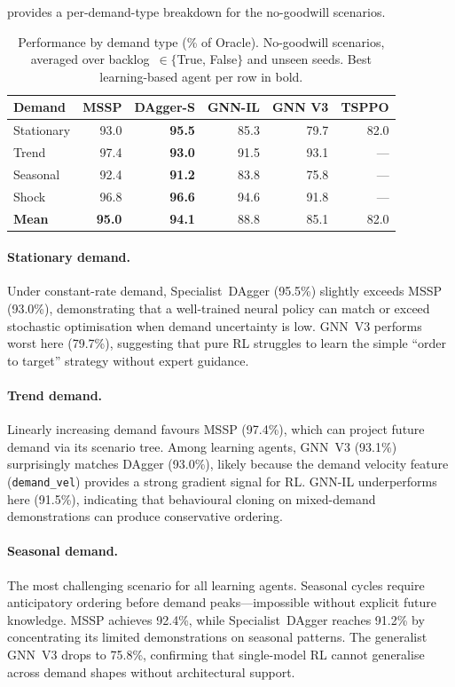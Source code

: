  provides a per-demand-type breakdown for the
no-goodwill scenarios.

\begin{table}[htbp]
\centering
\caption{Performance by demand type (\% of Oracle). No-goodwill scenarios,
averaged over backlog~$\in \{$True, False$\}$ and unseen seeds. Best
learning-based agent per row in bold.}
\label{tab:scenario_breakdown}
\small
\begin{tabular}{lrrrrr}
\toprule
\textbf{Demand} & \textbf{MSSP} & \textbf{DAgger-S} & \textbf{GNN-IL}
                & \textbf{GNN V3} & \textbf{TSPPO} \\
\midrule
Stationary & 93.0 & \textbf{95.5} & 85.3 & 79.7 & 82.0 \\
Trend      & 97.4 & \textbf{93.0} & 91.5 & 93.1 & --- \\
Seasonal   & 92.4 & \textbf{91.2} & 83.8 & 75.8 & --- \\
Shock      & 96.8 & \textbf{96.6} & 94.6 & 91.8 & --- \\
\midrule
\textbf{Mean} & \textbf{95.0} & \textbf{94.1} & 88.8 & 85.1 & 82.0 \\
\bottomrule
\end{tabular}
\end{table}

\paragraph{Stationary demand.}
Under constant-rate demand, Specialist~DAgger (95.5\%) slightly exceeds
MSSP (93.0\%), demonstrating that a well-trained neural policy can match
or exceed stochastic optimisation when demand uncertainty is low. GNN~V3
performs worst here (79.7\%), suggesting that pure RL struggles to learn
the simple ``order to target'' strategy without expert guidance.

\paragraph{Trend demand.}
Linearly increasing demand favours MSSP (97.4\%), which can project future
demand via its scenario tree. Among learning agents, GNN~V3 (93.1\%)
surprisingly matches DAgger (93.0\%), likely because the demand velocity
feature (\texttt{demand\_vel}) provides a strong gradient signal for RL.
GNN-IL underperforms here (91.5\%), indicating that behavioural cloning
on mixed-demand demonstrations can produce conservative ordering.

\paragraph{Seasonal demand.}
The most challenging scenario for all learning agents. Seasonal cycles
require anticipatory ordering before demand peaks---impossible without
explicit future knowledge. MSSP achieves 92.4\%, while Specialist~DAgger
reaches 91.2\% by concentrating its limited demonstrations on seasonal
patterns. The generalist GNN~V3 drops to 75.8\%, confirming that
single-model RL cannot generalise across demand shapes without
architectural support.

